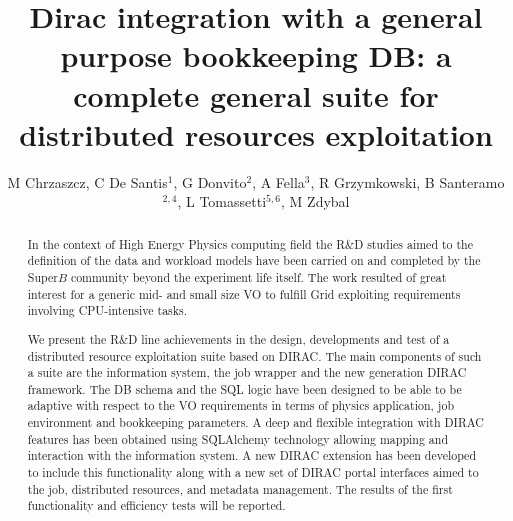 \documentclass[a4paper]{jpconf}
\begin{document}
\title{Dirac integration with a general purpose bookkeeping DB: a complete general suite for distributed resources exploitation}

\author{M Chrzaszcz, C De Santis$^1$, G Donvito$^2$, A Fella$^3$, R Grzymkowski, B Santeramo$^{2,4}$, L Tomassetti$^{5,6}$, M Zdybal}
\address{$^1$ INFN - Sezione di Roma Tor Vergata, Roma, Italy}
\address{$^2$ INFN - Sezione di Bari, Bari, Italy}
\address{$^3$ NFN - Sezione di Pisa, Pisa, Italy}
\address{$^4$ Dipartimento di Fisica dell’Universit\'a e del Politecnico di Bari, Bari, Italy}
\address{$^5$ Dipartimento di Matematica e Informatica, Universit\'a di Ferrara, Ferrara, Italy}
\address{$^6$ INFN - Sezione di Ferrara, Ferrara, Italy}

%
%
%
%
%

\begin{abstract}
In the context of High Energy Physics computing field the R\&D studies aimed to
the definition of the data and workload models have been carried on and 
completed by the Super$B$ community beyond the experiment life itself.
The work resulted of great interest for a generic mid- and small size VO to 
fulfill Grid exploiting requirements involving CPU-intensive tasks.

We present the R\&D line achievements in the design, developments and test of a
distributed resource exploitation suite based on DIRAC. The main components of
such a suite are the information system, the job wrapper and the new generation
DIRAC framework. The DB schema and the SQL logic have been designed to be able
to be adaptive with respect to the VO requirements in terms of physics 
application, job environment and bookkeeping parameters. A deep and flexible 
integration with DIRAC features has been obtained using SQLAlchemy technology
allowing mapping and interaction with the information system. A new DIRAC
extension has been developed to include this functionality along with a new set
of DIRAC portal interfaces aimed to the job, distributed resources, and
metadata management. The results of the first functionality and efficiency
tests will be reported.
\end{abstract}
\end{document}
